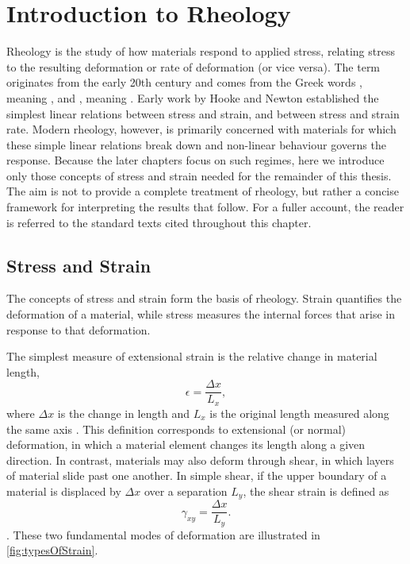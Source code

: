 \documentclass[asymmetricmargins]{library/duthesis}%
\begin{document}
\section{Introduction to Rheology} \label{sec:IntroRheology}

Rheology is the study of how materials respond to applied stress, relating stress to the resulting deformation or rate of deformation \cite{larson_structure_1999,chenRheologySoftMaterials2010,tannerEngineeringRheology2000,barnes_introduction_1989} (or vice versa). The term originates from the early 20th century and comes from the Greek words , meaning , and , meaning  \cite{barnes_introduction_1989}. Early work by Hooke \cite{hooke_lectures_1678} and Newton \cite{newton_philosophiae_1687} established the simplest linear relations between stress and strain, and between stress and strain rate. Modern rheology, however, is primarily concerned with materials for which these simple linear relations break down and non-linear behaviour governs the response. Because the later chapters focus on such regimes, here we introduce only those concepts of stress and strain needed for the remainder of this thesis. The aim is not to provide a complete treatment of rheology, but rather a concise framework for interpreting the results that follow. For a fuller account, the reader is referred to the standard texts cited throughout this chapter.

\subsection{Stress and Strain} \label{sec:StressAndStrain}

The concepts of stress and strain form the basis of rheology. Strain quantifies the deformation of a material, while stress measures the internal forces that arise in response to that deformation.

The simplest measure of extensional strain is the relative change in material length,
\begin{equation}
    \epsilon = \frac{\Delta x}{L_x},
    \label{eq:simpleStrain}
\end{equation}
where $\Delta x$ is the change in length and $L_x$ is the original length measured along the same axis \cite{lubliner2008plasticity,macoskoRheologyPrinciplesMeasurements1994,barnes_introduction_1989}. This definition corresponds to extensional (or normal) deformation, in which a material element changes its length along a given direction. In contrast, materials may also deform through shear, in which layers of material slide past one another. In simple shear, if the upper boundary of a material is displaced by $\Delta x$ over a separation $L_y$, the shear strain is defined as
\begin{equation}
    \gamma_{xy} = \frac{\Delta x}{L_y}.
\end{equation}
\cite{lubliner2008plasticity,macoskoRheologyPrinciplesMeasurements1994,barnes_introduction_1989}. These two fundamental modes of deformation are illustrated in \cref{fig:typesOfStrain}.
\end{document}
